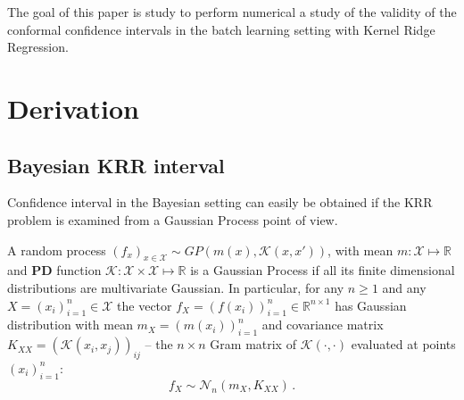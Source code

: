 \documentclass[a4paper]{article}
\newcommand{\Ncal}{\mathcal{N}}
\newcommand{\Kcal}{\mathcal{K}}
\newcommand{\Xcal}{\mathcal{X}}
\newcommand{\Real}{\mathbb{R}}
\begin{document}
The goal of this paper is study to perform numerical a study of the validity of
the conformal confidence intervals in the batch learning setting with Kernel Ridge
Regression.



\section{Derivation} %
\label{sec:derivation}

\subsection{Bayesian KRR interval} %
\label{sub:bayesian_krr_interval}

Confidence interval in the Bayesian setting can easily be obtained if the KRR
problem is examined from a Gaussian Process point of view.

A random process $(f_x)_{x\in \Xcal} \sim GP(m(x), \Kcal(x,x'))$, with mean $m : \Xcal
\mapsto \Real$ and \textbf{PD} function $\Kcal : \Xcal \times \Xcal \mapsto \Real$
is a Gaussian Process if all its finite dimensional distributions are multivariate
Gaussian. In particular, for any $n\geq1$ and any $X = (x_i)_{i=1}^n \in \Xcal$ the
vector $f_X = (f(x_i))_{i=1}^n \in \Real^{n\times 1}$ has Gaussian distribution with
mean $m_X = (m(x_i))_{i=1}^n$ and covariance matrix $K_{XX} = (\Kcal(x_i,x_j))_{ij}$ --
the $n\times n$ Gram matrix of $\Kcal(\cdot,\cdot)$ evaluated at points $(x_i)_{i=1}^n$:
\begin{equation*}
  f_X \sim \Ncal_n(m_X, K_{XX}) \,.
\end{equation*}
\end{document}
